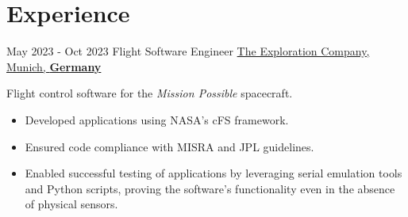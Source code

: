 \documentclass[letterpaper]{twentysecondcv} %
\begin{document}
\makeprofile %

%
%
\section{Experience}

\begin{twenty} %

    \twentyitem
        {May 2023 -}
        {Oct 2023}
        {Flight Software Engineer}
        {\href{https://www.exploration.space/}{The Exploration Company, Munich, \textbf{Germany}}}
        {}
        {
            Flight control software for the \textit{Mission Possible} spacecraft.
            \vspace{1 mm}
            \begin{itemize}
                \item Developed applications  using NASA's cFS framework.
                \item Ensured code compliance with MISRA and JPL guidelines.
                \item Enabled successful testing of applications by leveraging serial emulation tools and Python scripts, proving the software's functionality even in the absence of physical sensors.
            \end{itemize}

}
\end{twenty}
\end{document}
